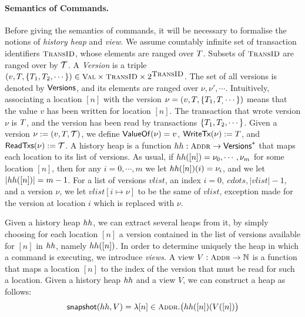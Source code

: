 \documentclass[a4paper,UKenglish]{article}%
\theoremstyle{plain}
\begin{document}
\paragraph{\textbf{Semantics of Commands.}}
Before giving the semantics of commands, it will be necessary to formalise 
the notions of \emph{history heap} and \emph{view}. 
We assume countably infinite set of transaction identifiers $\TransID$, whose elements 
are ranged over $T$. Subsets of $\TransID$ are ranged over by $\mathcal{T}$. 
A \emph{Version} is a triple 
$(v, \tsid, \{\tsid_1, \tsid_2,\cdots\}) \in \Val \times \TransID \times 2^{\TransID}$. 
The set of all versions is denoted by $\mathsf{Versions}$, and its elements are ranged over $\nu, \nu', \cdots$. 
Intuitively, associating a location $[n]$ with the version $\nu = (v, T, \{T_1,T_,\cdots\})$ means that the 
value $v$ has been written for location $[n]$. The transaction that wrote version $\nu$ is $T$, 
and the version has been read by transactions $\{T_1,T_2,\cdots\}$. 
Given a version $\nu := (v, T, \mathcal{T})$, we define $\mathsf{ValueOf}(\nu) = v$, $\mathsf{WriteTx}(\nu) := T$, 
and $\mathsf{ReadTxs}(\nu) := \mathcal{T}$.
A history heap is a function $\hh: \Addr \rightarrow \Versions^{\ast}$ that 
maps each location to its list of versions. As usual, if 
$hh([n]) = \nu_0,\cdots, \nu_m$ for some location $[n]$, then for any 
$i= 0,\cdots, m$ we let $hh([n])(i) = \nu_i$, and we let $\lvert hh([n]) \rvert = m -1$. 
For a list of versions $vlist$, an index $i = 0,\ cdots, \lvert vlist \rvert - 1$, and a version $\nu$, 
we let  $vlist[i \mapsto \nu]$ to be the same of $vlist$, exception made for the version at 
location $i$ which is replaced with $\nu$.

Given a history heap $hh$, we can extract several heaps 
from it, by simply choosing for each location $[n]$ a version 
contained in the list of versions available for $[n]$ in $hh$, 
namely $hh([n])$. 
In order to determine uniquely the heap in which a command 
is executing, we introduce \emph{views}. A view $V : \Addr \rightarrow \mathbb{N}$ is 
a function that maps a location $[n]$ to the index of the version 
that must be read for such a location. Given a history heap $hh$ and a 
view $V$, we can construct a heap as follows:  
\[
\snapshot(\hh, V) = \lambda [n] \in \Addr. \big( \hh([n])(V([n]) \big)
\]
\end{document}
